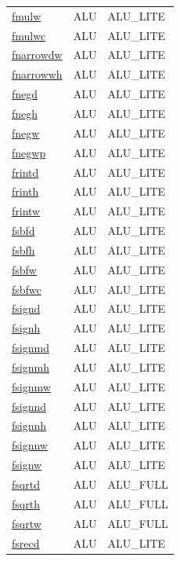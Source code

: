 \begin{small}
\begin{longtable}[l]{l l l}
\hyperlink{lvx.fmulw}{fmulw} & ALU & ALU\_LITE \\ 
\hyperlink{lvx.fmulwc}{fmulwc} & ALU & ALU\_LITE \\ 
\hyperlink{lvx.fnarrowdw}{fnarrowdw} & ALU & ALU\_LITE \\ 
\hyperlink{lvx.fnarrowwh}{fnarrowwh} & ALU & ALU\_LITE \\ 
\hyperlink{lvx.fnegd}{fnegd} & ALU & ALU\_LITE \\ 
\hyperlink{lvx.fnegh}{fnegh} & ALU & ALU\_LITE \\ 
\hyperlink{lvx.fnegw}{fnegw} & ALU & ALU\_LITE \\ 
\hyperlink{lvx.fnegwp}{fnegwp} & ALU & ALU\_LITE \\ 
\hyperlink{lvx.frintd}{frintd} & ALU & ALU\_LITE \\ 
\hyperlink{lvx.frinth}{frinth} & ALU & ALU\_LITE \\ 
\hyperlink{lvx.frintw}{frintw} & ALU & ALU\_LITE \\ 
\hyperlink{lvx.fsbfd}{fsbfd} & ALU & ALU\_LITE \\ 
\hyperlink{lvx.fsbfh}{fsbfh} & ALU & ALU\_LITE \\ 
\hyperlink{lvx.fsbfw}{fsbfw} & ALU & ALU\_LITE \\ 
\hyperlink{lvx.fsbfwc}{fsbfwc} & ALU & ALU\_LITE \\ 
\hyperlink{lvx.fsignd}{fsignd} & ALU & ALU\_LITE \\ 
\hyperlink{lvx.fsignh}{fsignh} & ALU & ALU\_LITE \\ 
\hyperlink{lvx.fsignmd}{fsignmd} & ALU & ALU\_LITE \\ 
\hyperlink{lvx.fsignmh}{fsignmh} & ALU & ALU\_LITE \\ 
\hyperlink{lvx.fsignmw}{fsignmw} & ALU & ALU\_LITE \\ 
\hyperlink{lvx.fsignnd}{fsignnd} & ALU & ALU\_LITE \\ 
\hyperlink{lvx.fsignnh}{fsignnh} & ALU & ALU\_LITE \\ 
\hyperlink{lvx.fsignnw}{fsignnw} & ALU & ALU\_LITE \\ 
\hyperlink{lvx.fsignw}{fsignw} & ALU & ALU\_LITE \\ 
\hyperlink{lvx.fsqrtd}{fsqrtd} & ALU & ALU\_FULL \\ 
\hyperlink{lvx.fsqrth}{fsqrth} & ALU & ALU\_FULL \\ 
\hyperlink{lvx.fsqrtw}{fsqrtw} & ALU & ALU\_FULL \\ 
\hyperlink{lvx.fsrecd}{fsrecd} & ALU & ALU\_LITE \\ 

\end{longtable}
\end{small}
